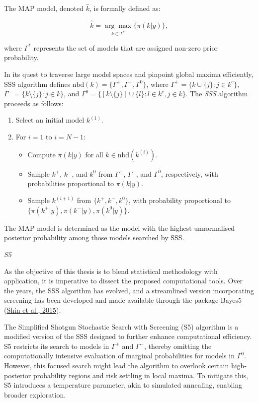 \documentclass[
  11pt,
]{article}
\begin{document}
The MAP model, denoted \(\hat{k}\), is formally defined as:

\begin{equation}
\hat{k} = \underset{k \in \Gamma^*}{\arg\max} \{\pi(k | y)\},
\end{equation}

where \(\Gamma^*\) represents the set of models that are assigned
non-zero prior probability.

In its quest to traverse large model spaces and pinpoint global maxima
efficiently, SSS algorithm defines
\(\text{nbd}(k) = \{\Gamma^+, \Gamma^-, \Gamma^0\}\), where
\(\Gamma^+ = \{k \cup \{j\} : j \in k^c\}\),
\(\Gamma^- = \{k \setminus \{j\} : j \in k\}\), and
\(\Gamma^0 = \{[k \setminus \{j\}] \cup \{l\} : l \in k^c, j \in k\}\).
The \emph{SSS} algorithm proceeds as follows:

\begin{enumerate}
    \item Select an initial model $k^{(1)}$.
    \item For $i = 1$ to $i = N - 1$:
    \begin{itemize}
        \item Compute $\pi(k | y)$ for all $k \in \text{nbd}(k^{(i)})$.
        \item Sample $k^+$, $k^-$, and $k^0$ from $\Gamma^+$, $\Gamma^-$, and $\Gamma^0$, 
        respectively, with probabilities proportional to $\pi(k | y)$.
        \item Sample $k^{(i+1)}$ from $\{k^+, k^-, k^0\}$, with probability proportional to $\{\pi(k^+ | y), \pi(k^- | y), \pi(k^0 | y)\}$.
    \end{itemize}
\end{enumerate}

The MAP model is determined as the model with the highest unnormalised
posterior probability among those models searched by SSS.

\emph{S5}

As the objective of this thesis is to blend statistical methodology with
application, it is imperative to dissect the proposed computational
tools. Over the years, the SSS algorithm has evolved, and a streamlined
version incorporating screening has been developed and made available
through the package Bayes5 (\protect\hyperlink{ref-Shin2015}{Shin et
al., 2015}).

The Simplified Shotgun Stochastic Search with Screening (S5) algorithm
is a modified version of the SSS designed to further enhance
computational efficiency. S5 restricts its search to models in
\(\Gamma^+\) and \(\Gamma^-\), thereby omitting the computationally
intensive evaluation of marginal probabilities for models in
\(\Gamma^0\). However, this focused search might lead the algorithm to
overlook certain high-posterior probability regions and risk settling in
local maxima. To mitigate this, S5 introduces a temperature parameter,
akin to simulated annealing, enabling broader exploration.
\end{document}
